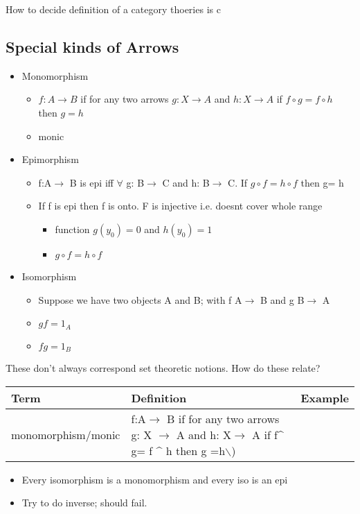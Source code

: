 \documentclass[11pt]{article}
\begin{document}
How to decide definition of a category thoeries is c

\subsection{Special kinds of Arrows}
\label{sec:org860ab9f}

\begin{itemize}
\item Monomorphism
\begin{itemize}
\item \(f:A\rightarrow B\) if for any two arrows \(g: X \rightarrow A\) and \(h: X\rightarrow A\) if \(f\circ g= f \circ h\) then \(g =h\)
\item monic
\end{itemize}
\item Epimorphism
\begin{itemize}
\item f:A\(\rightarrow\) B is epi iff \(\forall\) g: B\(\rightarrow\) C and h: B\(\rightarrow\) C. If \(g\circ f = h\circ f\) then g= h
\item If f is epi then f is onto. F is injective i.e. doesnt cover whole range
\begin{itemize}
\item function \(g(y_0)=0\) and \(h(y_0)=1\)
\item \(g\circ f = h\circ f\)
\end{itemize}
\end{itemize}
\item Isomorphism
\begin{itemize}
\item Suppose we have two objects A and B; with f A\(\rightarrow\) B and g B\(\rightarrow\) A
\item \(gf=1_A\)
\item \(fg=1_B\)
\end{itemize}
\end{itemize}

These don't always correspond set theoretic notions. How do these relate?

\begin{center}
\begin{tabular}{lll}
Term & Definition & Example\\
\hline
monomorphism/monic & f:A\(\rightarrow\) B if for any two arrows g: X \(\rightarrow\) A and h: X\(\rightarrow\) A if f\^{} g= f \^{} h then g =h$\backslash$) & \\
\end{tabular}
\end{center}

\begin{itemize}
\item Every isomorphism is a monomorphism and every iso is an epi
\item Try to do inverse; should fail.
\end{itemize}
\end{document}
